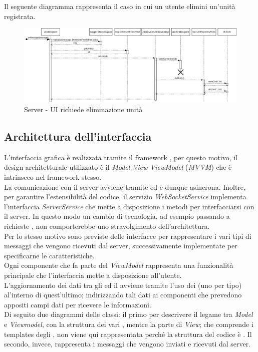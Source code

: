 		\begin{landscape}
			Il seguente diagramma rappresenta il caso in cui un utente elimini un'unità registrata.
			\begin{figure}[H]
				\centering
				\includegraphics[width=25.7cm]{img/server_seq3.png}
				\caption{Server - UI richiede eliminazione unità}
			\end{figure}
		\end{landscape}
	
\subsection{Architettura dell'interfaccia}
	L'interfaccia grafica è realizzata tramite il framework , per questo motivo, il design architetturale utilizzato è il \textit{Model View ViewModel} (\textit{MVVM}) che è intrinseco nel framework stesso. \\
	La comunicazione con il server avviene tramite  ed è dunque asincrona. 
	Inoltre, per garantire l'estensibilità del codice, il servizio \textit{WebSocketService} implementa l'interfaccia \textit{ServerService} che mette a disposizione i metodi per interfacciarsi con il server. In questo modo un cambio di tecnologia, ad esempio passando a richieste , non comporterebbe uno stravolgimento dell'architettura. \\
	Per lo stesso motivo sono previste delle interfacce per rappresentare i vari tipi di messaggi che vengono ricevuti dal server, successivamente implementate per specificarne le caratteristiche. \\
	Ogni componente che fa parte del \textit{ViewModel} rappresenta una funzionalità principale che l'interfaccia mette a disposizione all'utente.\\
	L'aggiornamento dei dati tra gli  ed il  avviene tramite l'uso dei  (uno per tipo) al'interno di quest'ultimo; indirizzando tali dati  ai componenti che prevedono appositi campi dati per ricevere le informazioni.\\
	\newline
	Di seguito due diagrammi delle classi: il primo per descrivere il legame tra \textit{Model} e \textit{Viewmodel}, con la struttura dei vari , mentre la parte di \textit{View}; che comprende i templates degli , non viene qui rappresentata perché la struttura del codice è .
	Il secondo, invece, rappresenta i messaggi che vengono inviati e ricevuti dal server.
	\newpage
	
